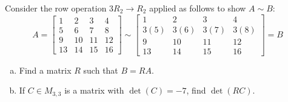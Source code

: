 \begin{activity}{5}
Consider the row operation \(3R_2\to R_2\) applied as follows to show
\(A\sim B\):
\[
A=\begin{bmatrix}1&2&3&4\\5&6&7&8\\9&10&11&12 \\ 13 & 14 & 15 & 16\end{bmatrix}
  \sim
\begin{bmatrix}1&2&3&4\\3(5)&3(6)&3(7)&3(8)\\9&10&11&12 \\ 13 & 14 & 15 & 16\end{bmatrix}=B
\]
\begin{enumerate}[(a)]
\item Find a matrix \(R\) such that \(B=RA\).
\item If \(C \in M_{3,3}\) is a matrix with \(\det(C)= -7\), find \(\det(RC)\).
\end{enumerate}
\end{activity}


